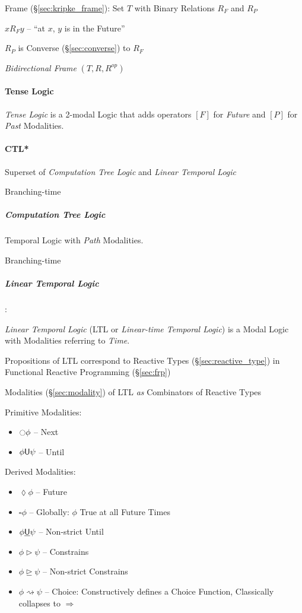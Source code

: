 Frame (\S\ref{sec:kripke_frame}): Set $T$ with Binary Relations $R_F$
and $R_P$

$x R_F y$ -- ``at $x$, $y$ is in the Future''

$R_P$ is Converse (\S\ref{sec:converse}) to $R_F$

\emph{Bidirectional Frame} $(T,R,R^{op})$



\paragraph{Tense Logic}\label{sec:tense_logic}\hfill

\emph{Tense Logic} is a 2-modal Logic that adds operators $[F]$ for
\emph{Future} and $[P]$ for \emph{Past} Modalities.



\paragraph{CTL*}\label{sec:ctl_star}\hfill

Superset of \emph{Computation Tree Logic} and \emph{Linear
  Temporal Logic}

Branching-time



\subparagraph{Computation Tree Logic}\label{sec:ctl}\hfill

Temporal Logic with \emph{Path} Modalities.

Branching-time



\subparagraph{Linear Temporal Logic}\label{sec:linear_temporal}\hfill

\cite{jeffrey12}:

\emph{Linear Temporal Logic} (LTL or \emph{Linear-time Temporal
  Logic}) is a Modal Logic with Modalities referring to \emph{Time}.

Propositions of LTL correspond to Reactive Types
(\S\ref{sec:reactive_type}) in Functional Reactive Programming
(\S\ref{sec:frp})

Modalities (\S\ref{sec:modality}) of LTL \emph{as} Combinators of
Reactive Types

Primitive Modalities:
\begin{itemize}
  \item $\ocircle \phi$ -- Next
  \item $\phi \mathsf{U} \psi$ -- Until
\end{itemize}

Derived Modalities:
\begin{itemize}
  \item $\lozenge \phi$ -- Future
  \item $\square \phi$ -- Globally: $\phi$ True at all Future Times
  \item $\phi \underline{\mathsf{U}} \psi$ -- Non-strict Until
  \item $\phi \rhd \psi$ -- Constrains
  \item $\phi \unrhd \psi$ -- Non-strict Constrains
  \item $\phi \rightsquigarrow \psi$ -- Choice: Constructively defines
    a Choice Function, Classically collapses to $\Rightarrow$
\end{itemize}

